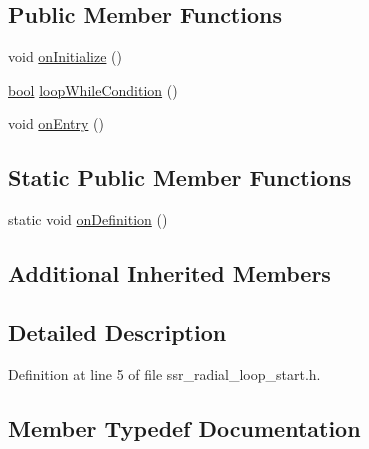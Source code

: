 \subsection*{Public Member Functions}
\begin{DoxyCompactItemize}
\item 
void \hyperlink{structsm__dance__bot_1_1radial__motion_1_1SsrRadialLoopStart_a3c02de529cc3a5dd79142742447e581b}{on\+Initialize} ()
\item 
\hyperlink{classbool}{bool} \hyperlink{structsm__dance__bot_1_1radial__motion_1_1SsrRadialLoopStart_a2e2e0d6d7ef4c775b52e43bb5b47d366}{loop\+While\+Condition} ()
\item 
void \hyperlink{structsm__dance__bot_1_1radial__motion_1_1SsrRadialLoopStart_a4e8d83a0ea2e6e1859f42b679dcbce3a}{on\+Entry} ()
\end{DoxyCompactItemize}
\subsection*{Static Public Member Functions}
\begin{DoxyCompactItemize}
\item 
static void \hyperlink{structsm__dance__bot_1_1radial__motion_1_1SsrRadialLoopStart_a5117ab26ff1d6d8236e92dc60e759696}{on\+Definition} ()
\end{DoxyCompactItemize}
\subsection*{Additional Inherited Members}


\subsection{Detailed Description}


Definition at line 5 of file ssr\+\_\+radial\+\_\+loop\+\_\+start.\+h.



\subsection{Member Typedef Documentation}
